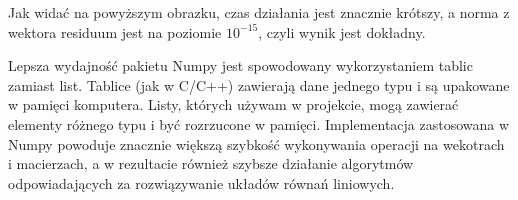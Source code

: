\documentclass[fleqn]{article}
\begin{document}
    \noindent Jak widać na powyższym obrazku, czas działania jest znacznie krótszy, a norma z wektora residuum
    jest na poziomie $10^{-15}$, czyli wynik jest dokładny. 

    \noindent Lepsza wydajność pakietu Numpy jest spowodowany wykorzystaniem tablic zamiast list. Tablice (jak w C/C++)
    zawierają dane jednego typu i są upakowane w pamięci komputera. Listy, których używam w projekcie, 
    mogą zawierać elementy różnego typu i być rozrzucone w pamięci. Implementacja zastosowana w Numpy
    powoduje znacznie większą szybkość wykonywania operacji na wekotrach i macierzach, a w rezultacie również szybsze
    działanie algorytmów odpowiadających za rozwiązywanie układów równań liniowych.
\end{document}
